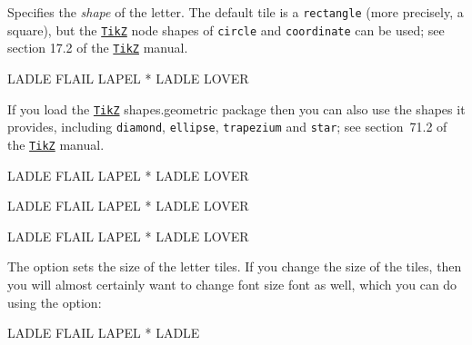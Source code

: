 \documentclass[svgnames]{report}
\newcommand\ctan[1]{\href{https://www.ctan.org/pkg/#1}{\texttt{#1}}}
\begin{document}

  Specifies the \textit{shape} of the  letter. The default tile
   is a \texttt{rectangle} (more precisely, a square), but the
  \ctan{TikZ} node shapes of \texttt{circle} and \texttt{coordinate} can
  be used; see section 17.2 of the \ctan{TikZ} manual.


  \begin{example}
    \begin{wordle}[shape=circle]{LADLE}
       FLAIL LAPEL * LADLE LOVER
    \end{wordle}
  \end{example}

  If you load the \ctan{TikZ} \textsf{shapes.geometric} package then you
  can also use the shapes it provides, including \texttt{diamond},
  \texttt{ellipse}, \texttt{trapezium} and \texttt{star}; see section~71.2
  of the \ctan{TikZ} manual.

  \begin{example}
    \begin{wordle}[shape=diamond]{LADLE}
       FLAIL LAPEL * LADLE LOVER
    \end{wordle}
  \end{example}

  \begin{example}
    \begin{wordle}[style=sutom]{LADLE}
       FLAIL LAPEL * LADLE LOVER
    \end{wordle}
  \end{example}

  \begin{example}
    \begin{wordle}[style=hard]{LADLE}
       FLAIL LAPEL * LADLE LOVER
    \end{wordle}
  \end{example}


  The  option sets the size of the 
  letter tiles.  If you change the size  of the tiles, then you will
  almost certainly want to change font size font as well, which you can
  do using the  option:

  \begin{example}
    \begin{wordle}[size=10mm, font=\huge\bfseries]{LADLE}
       FLAIL LAPEL * LADLE
    \end{wordle}
  \end{example}
\end{document}
